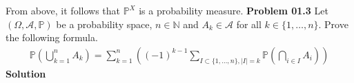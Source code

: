 \documentclass[a4paper]{book}
\theoremstyle{definition}
\begin{document}
From above, it follows that \(\mathbb{P}^X\) is a probability measure.
\newpage
\noindent\textbf{Problem 01.3}
Let \((\Omega, \mathcal{A}, \mathbb{P})\) be a probability space, \(n \in \mathbb{N}\) and \(A_k \in \mathcal{A}\) for all \(k \in \{1, \dots, n\}\). Prove the following formula.
\begin{align}
    \mathbb{P} \left( \bigcup_{k=1}^n A_k \right) = \sum_{k = 1}^n \left( (-1)^{k-1} \sum_{I \subset \{1, \dots, n\}, |I| = k } \mathbb{P} \left( \bigcap_{i \in I} A_i \right) \right)
\end{align}
\newline
\newline
\textbf{Solution}
\end{document}
